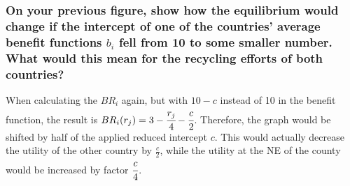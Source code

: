     \subsubsection{On your previous figure, show how the equilibrium would change if the intercept of one of the countries' average benefit functions $b_i$ fell from 10 to some smaller number. What would this mean for the recycling efforts of both countries?}
    When calculating the $BR_i$ again, but with $10-c$ instead of 10 in the benefit function, the result is
    $BR_i(r_j)=3-\cfrac{r_j}{4}-\cfrac{c}{2}$. Therefore, the graph would be shifted by half of the applied reduced intercept $c$.
    This would actually decrease the utility of the other country by $\frac{c}{2}$, while the utility at the NE of the county would be
    increased by factor $\cfrac{c}{4}$.

